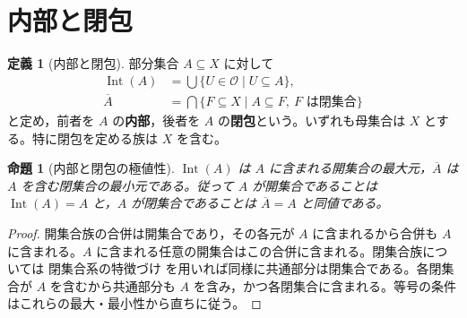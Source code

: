 \documentclass[a5paper,10pt,dvipdfmx]{jsarticle}
\theoremstyle{definition}
\newtheorem{defn}[ruledef]{定義}
\theoremstyle{plain}
\newtheorem{prop}[ruledef]{命題}
\newcommand{\GenronRefText}[2]{#2}
\begin{document}
\section{内部と閉包}
\begin{defn}[内部と閉包]\label{k198}
部分集合 $A\subseteq X$ に対して
\begin{align*}
 \operatorname{Int}(A)&=\bigcup\{U\in\mathcal O\mid U\subseteq A\},\\
 \overline A&=\bigcap\{F\subseteq X\mid A\subseteq F,\ F\text{ は閉集合}\}
\end{align*}
と定め，前者を $A$ の\textbf{内部}，後者を $A$ の\textbf{閉包}という。いずれも母集合は $X$ とする。特に閉包を定める族は $X$ を含む。
\end{defn}
\begin{prop}[内部と閉包の極値性]\label{k199}
$\operatorname{Int}(A)$ は $A$ に含まれる開集合の最大元，$\overline A$ は $A$ を含む閉集合の最小元である。従って $A$ が開集合であることは $\operatorname{Int}(A)=A$ と，$A$ が閉集合であることは $\overline A=A$ と同値である。
\end{prop}
\begin{proof}
開集合族の合併は開集合であり，その各元が $A$ に含まれるから合併も $A$ に含まれる。$A$ に含まれる任意の開集合はこの合併に含まれる。閉集合族については \GenronRefText{K-000149}{閉集合系の特徴づけ} を用いれば同様に共通部分は閉集合である。各閉集合が $A$ を含むから共通部分も $A$ を含み，かつ各閉集合に含まれる。等号の条件はこれらの最大・最小性から直ちに従う。
\end{proof}
\end{document}
